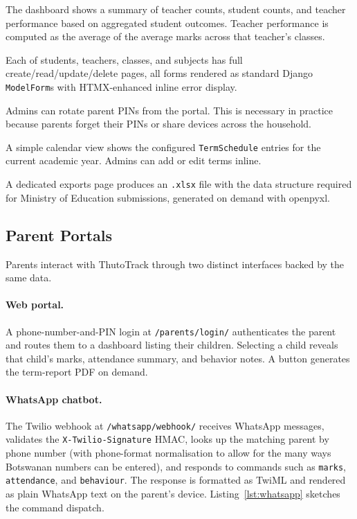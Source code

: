 \documentclass[11pt,a4paper]{article}
\begin{document}
\begin{description}[leftmargin=2em,style=nextline]
    \item[Dashboard.] The dashboard shows a summary of teacher counts,
    student counts, and teacher performance based on aggregated student
    outcomes. Teacher performance is computed as the average of the
    average marks across that teacher's classes.

    \item[CRUD for school entities.] Each of students, teachers, classes,
    and subjects has full create/read/update/delete pages, all forms
    rendered as standard Django \texttt{ModelForm}s with HTMX-enhanced
    inline error display.

    \item[Parent PIN management.] Admins can rotate parent PINs from
    the portal. This is necessary in practice because parents forget
    their PINs or share devices across the household.

    \item[School calendar.] A simple calendar view shows the configured
    \texttt{TermSchedule} entries for the current academic year. Admins
    can add or edit terms inline.

    \item[Ministry exports.] A dedicated exports page produces an
    \texttt{.xlsx} file with the data structure required for Ministry of
    Education submissions, generated on demand with openpyxl.
\end{description}

\subsection{Parent Portals}

Parents interact with ThutoTrack through two distinct interfaces backed by
the same data.

\paragraph{Web portal.} A phone-number-and-PIN login at \texttt{/parents/login/}
authenticates the parent and routes them to a dashboard listing their
children. Selecting a child reveals that child's marks, attendance summary,
and behavior notes. A button generates the term-report PDF on demand.

\paragraph{WhatsApp chatbot.} The Twilio webhook at
\texttt{/whatsapp/webhook/} receives WhatsApp messages, validates the
\texttt{X-Twilio-Signature} HMAC, looks up the matching parent by phone
number (with phone-format normalisation to allow for the many ways
Botswanan numbers can be entered), and responds to commands such as
\texttt{marks}, \texttt{attendance}, and \texttt{behaviour}. The response
is formatted as TwiML and rendered as plain WhatsApp text on the parent's
device. Listing~\ref{lst:whatsapp} sketches the command dispatch.
\end{document}
